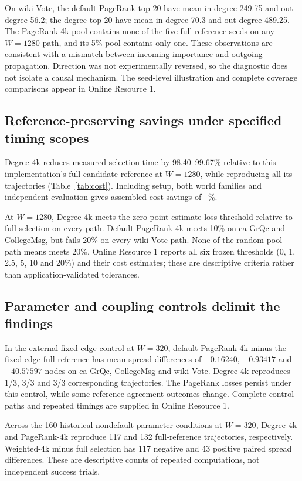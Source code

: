 \documentclass[smallextended]{svjour3}
\begin{document}
On wiki-Vote, the default PageRank top 20 have mean in-degree 249.75 and out-degree 56.2; the degree top 20 have mean in-degree 70.3 and out-degree 489.25. The PageRank-4k pool contains none of the five full-reference seeds on any $W=1280$ path, and its 5\% pool contains only one. These observations are consistent with a mismatch between incoming importance and outgoing propagation. Direction was not experimentally reversed, so the diagnostic does not isolate a causal mechanism. The seed-level illustration and complete coverage comparisons appear in Online Resource 1.

\subsection{Reference-preserving savings under specified timing scopes}
Degree-4k reduces measured selection time by 98.40--99.67\% relative to this implementation's full-candidate reference at $W=1280$, while reproducing all its trajectories (Table~\ref{tab:cost}). Including setup, both world families and independent evaluation gives assembled cost savings of \CollegeDegreeSaving{}--\WikiDegreeSaving{}\%.


At $W=1280$, Degree-4k meets the zero point-estimate loss threshold relative to full selection on every path. Default PageRank-4k meets 10\% on ca-GrQc and CollegeMsg, but fails 20\% on every wiki-Vote path. None of the random-pool path means meets 20\%. Online Resource 1 reports all six frozen thresholds (0, 1, 2.5, 5, 10 and 20\%) and their cost estimates; these are descriptive criteria rather than application-validated tolerances.

\subsection{Parameter and coupling controls delimit the findings}

In the external fixed-edge control at $W=320$, default PageRank-4k minus the fixed-edge full reference has mean spread differences of $-0.16240$, $-0.93417$ and $-40.57597$ nodes on ca-GrQc, CollegeMsg and wiki-Vote. Degree-4k reproduces 1/3, 3/3 and 3/3 corresponding trajectories. The PageRank losses persist under this control, while some reference-agreement outcomes change. Complete control paths and repeated timings are supplied in Online Resource 1.

Across the 160 historical nondefault parameter conditions at $W=320$, Degree-4k and PageRank-4k reproduce 117 and 132 full-reference trajectories, respectively. Weighted-4k minus full selection has 117 negative and 43 positive paired spread differences. These are descriptive counts of repeated computations, not independent success trials.
\end{document}
